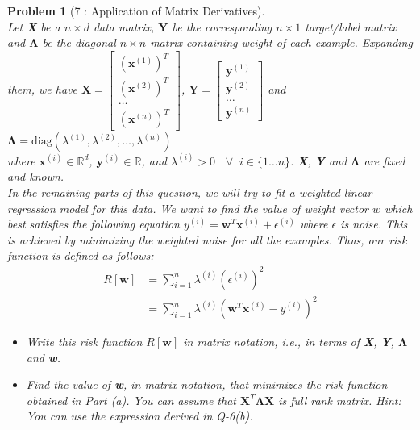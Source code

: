 \documentclass[11pt]{article}
\theoremstyle{quest}
\newtheorem*{question}{Problem}
\begin{document}
\newpage
\begin{question}[7 : Application of Matrix Derivatives]
\mbox{}\\
\noindent
Let \textbf{X} be a $n\times d$ data matrix, $\textbf{Y}$ be the corresponding $n\times 1$ target/label matrix and $\boldsymbol{\Lambda}$ be the diagonal $n\times n$ matrix containing weight of each example. 
Expanding them, we have $\textbf{X} = \left[ \begin{smallmatrix} (\textbf{x}^{(1)})^T \\ (\textbf{x}^{(2)})^T \\ \dots \\ (\textbf{x}^{(n)})^T \end{smallmatrix} \right]$, 
$\textbf{Y} = \left[ \begin{smallmatrix} \textbf{y}^{(1)} \\ \textbf{y}^{(2)} \\ \dots \\ \textbf{y}^{(n)} \end{smallmatrix} \right]$ 
and $\boldsymbol{\Lambda} = \text{diag}(\lambda^{(1)},\lambda^{(2)},\dots,\lambda^{(n)})$\\
where $\textbf{x}^{(i)} \in \mathbb{R}^d$, $\textbf{y}^{(i)} \in \mathbb{R}$, and $\lambda^{(i)} > 0$ 
$\;\;\forall\;\;i\in\{1\dots n\}$. \textbf{X}, \textbf{Y} and $\boldsymbol{\Lambda}$ are fixed and known.\\
In the remaining parts of this question, we will try to fit a weighted linear regression model for this data. We want to find the value of weight vector $w$ which best satisfies the following equation $y^{(i)}=\textbf{w}^T\textbf{x}^{(i)}+\epsilon^{(i)}$ where $\epsilon$ is noise. This is achieved by minimizing the weighted noise for all the examples. Thus, our risk function is defined as follows:
\begin{align*}
R[\textbf{w}] &= \sum_{i=1}^{n} \lambda^{(i)}(\epsilon^{(i)})^2\\
&= \sum_{i=1}^{n} \lambda^{(i)}(\textbf{w}^T\textbf{x}^{(i)}-y^{(i)})^2
\end{align*}
\begin{itemize}
\item[(a)] Write this risk function $R[\textbf{w}]$ in matrix notation, i.e., in terms of \textbf{X}, \textbf{Y}, $\boldsymbol{\Lambda}$ and \textbf{w}.
\item[(b)] Find the value of \textbf{w}, in matrix notation, that minimizes the risk function obtained in Part (a). You can assume that $\textbf{X}^T\boldsymbol{\Lambda}\textbf{X}$ is full rank matrix. Hint: You can use the expression derived in Q-6(b).

\end{itemize}
\end{question}
\end{document}
